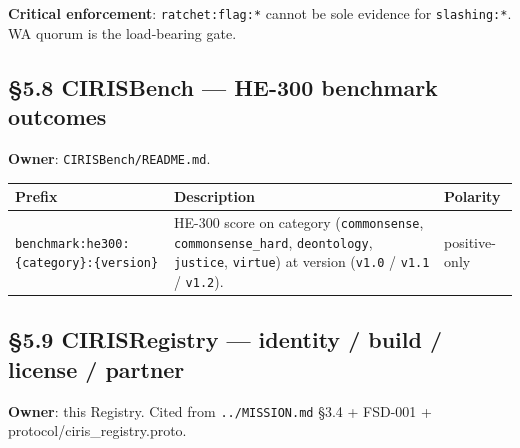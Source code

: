 \documentclass[10pt]{article}
\begin{document}
\textbf{Critical enforcement}: \texttt{ratchet:flag:*} cannot be sole evidence for \texttt{slashing:*}. WA quorum is the load-bearing gate.


\subsection*{§5.8 CIRISBench — HE-300 benchmark outcomes}


\textbf{Owner}: \texttt{CIRISBench/README.md}.


{\footnotesize
\begin{longtable}{|p{5.33cm}|p{5.33cm}|p{5.33cm}|}\hline
\textbf{Prefix} & \textbf{Description} & \textbf{Polarity} \\ \hline\endhead
\texttt{benchmark:he300:\{category\}:\{version\}} & HE-300 score on category (\texttt{commonsense}, \texttt{commonsense\_hard}, \texttt{deontology}, \texttt{justice}, \texttt{virtue}) at version (\texttt{v1.0} / \texttt{v1.1} / \texttt{v1.2}). & positive-only \\ \hline
\end{longtable}}


\subsection*{§5.9 CIRISRegistry — identity / build / license / partner}


\textbf{Owner}: this Registry. Cited from \texttt{../MISSION.md} §3.4 + FSD-001 + protocol/ciris\_registry.proto.
\end{document}

